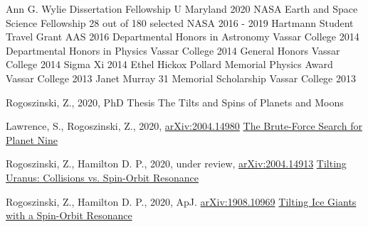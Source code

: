 \documentclass[]{awesome-cv}
\begin{document}
\vspace{-2mm}

\begin{cvhonors}
	\cvhonor
	{Ann G. Wylie Dissertation Fellowship}
	{}
	{U Maryland}
	{2020}
	\cvhonor
	{NASA Earth and Space Science Fellowship}
	{28 out of 180 selected}
	{NASA}
	{2016 - 2019}
	\cvhonor
	{Hartmann Student Travel Grant}
	{}
	{AAS}
	{2016}
	\cvhonor
	{Departmental Honors in Astronomy}
	{}
	{Vassar College}
	{2014}
	\cvhonor
	{Departmental Honors in Physics}
	{}
	{Vassar College}
	{2014}
	\cvhonor
	{General Honors}
	{}
	{Vassar College}
	{2014}
	\cvhonor
	{Sigma Xi}
	{}
	{}
	{2014}
	\cvhonor
	{Ethel Hickox Pollard Memorial Physics Award}
	{}
	{Vassar College}
	{2013}
	\cvhonor
	{Janet Murray \textquotesingle{}31 Memorial Scholarship}
	{}
	{Vassar College}
	{2013}
\end{cvhonors}

\vspace{-2mm}
\begin{cventries}
	\cventry
	{Rogoszinski, Z., 2020, PhD Thesis}
	{The Tilts and Spins of Planets and Moons}
	{}
	{}
	{}
	
	\vspace{-5mm}
	\cventry
	{Lawrence, S., Rogoszinski, Z., 2020, \href{https://arxiv.org/pdf/2004.14980.pdf}{arXiv:2004.14980}}
	{\href{https://ui.adsabs.harvard.edu/abs/2020arXiv200414980L/abstract}{The Brute-Force Search for Planet Nine}}
	{}
	{}
	{}
	
	\vspace{-5mm}
	\cventry
	{Rogoszinski, Z., Hamilton D. P., 2020, under review, \href{https://arxiv.org/pdf/2004.14913.pdf}{arXiv:2004.14913}}
	{\href{https://ui.adsabs.harvard.edu/abs/2020arXiv200414913R/abstract}{Tilting Uranus: Collisions vs. Spin-Orbit Resonance}}
	{}
	{}
	{}
	
	
	\vspace{-5mm}
	\cventry
	{Rogoszinski, Z., Hamilton D. P., 2020, ApJ. \href{https://arxiv.org/pdf/1908.10969.pdf}{arXiv:1908.10969}}
	{\href{https://ui.adsabs.harvard.edu/abs/2020ApJ...888...60R/abstract}{Tilting Ice Giants with a Spin-Orbit Resonance}}
	{}
	{}
	{}
	
	\vspace{-6mm}
\end{cventries}
\end{document}
